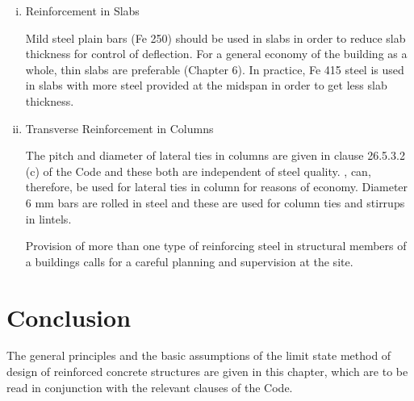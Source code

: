 \begin{enumerate}[(i)]


\item Reinforcement in Slabs

Mild steel plain bars (Fe 250) should be used in slabs in order to reduce
slab thickness for control of deflection. For a general economy of the
building as a whole, thin slabs are preferable (Chapter 6). In practice,
Fe 415 steel is used in slabs with more steel provided at the midspan
in order to get less slab thickness.

\item Transverse Reinforcement in Columns

The pitch and diameter of lateral ties in columns are given in clause
26.5.3.2 (c) of the Code and these both are independent of steel quality.
{\fetwofivezero}, {\fetwofivezero} can, therefore, be used for lateral
ties in column for reasons of economy. Diameter 6 mm bars are rolled in
{\fetwofivezero} steel and these are used for column ties and stirrups in lintels.

Provision of more than one type of reinforcing steel in structural
members of a buildings calls for a careful planning and supervision at
the site.
\end{enumerate}
\section{Conclusion}

The general principles and the basic assumptions of the limit state
method of design of reinforced concrete structures are given in this
chapter, which are to be read in conjunction with the relevant clauses
of the Code.
